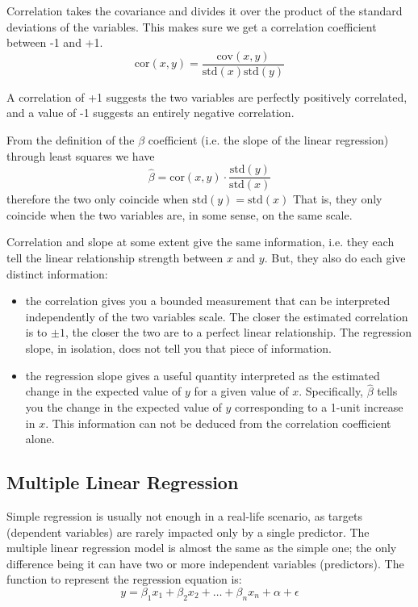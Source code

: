 Correlation takes the covariance and divides it over the product of the standard deviations of the variables. This makes sure we get a correlation coefficient between -1 and +1.
\begin{equation}
\textrm{cor}(x, y) = \frac{\textrm{cov}(x, y)}{\textrm{std}(x)\textrm{std}(y)}
\end{equation}

A correlation of +1 suggests the two variables are perfectly positively correlated, and a value of -1 suggests an entirely negative correlation.

From the definition of the $\beta$ coefficient (i.e. the slope of the linear regression) through least squares we have
\begin{equation}
\hat{\beta} = \textrm{cor}(x, y)\cdot \frac{\textrm{std}(y)}{\textrm{std}(x)}
\end{equation}
therefore the two only coincide when $\textrm{std}(y) = \textrm{std}(x)$ That is, they only coincide when the two variables are, in some sense, on the same scale. 

Correlation and slope at some extent give the same information, i.e. they each tell the linear relationship strength between $x$ and $y$. But, they also do each give distinct information:
\begin{itemize}
\item the correlation gives you a bounded measurement that can be interpreted independently of the two variables scale. The closer the estimated correlation is to $\pm1$, the closer the two are to a perfect linear relationship. The regression slope, in isolation, does not tell you that piece of information.
\item the regression slope gives a useful quantity interpreted as the estimated change in the expected value of $y$ for a given value of $x$. Specifically, $\hat{\beta}$ tells you the change in the expected value of $y$ corresponding to a 1-unit increase in $x$. This information can not be deduced from the correlation coefficient alone.
\end{itemize}

%

\subsection{Multiple Linear Regression}
Simple regression is usually not enough in a real-life scenario, as targets (dependent variables) are rarely impacted only by a single predictor.
The multiple linear regression model is almost the same as the simple one; the only difference being it can have two or more independent variables (predictors).
The function to represent the regression equation is:
\begin{equation}
y = \beta_1 x_1 + \beta_2 x_2 + \ldots + \beta_n x_n + \alpha + \epsilon
\label{eq:multiple_regression}
\end{equation}

